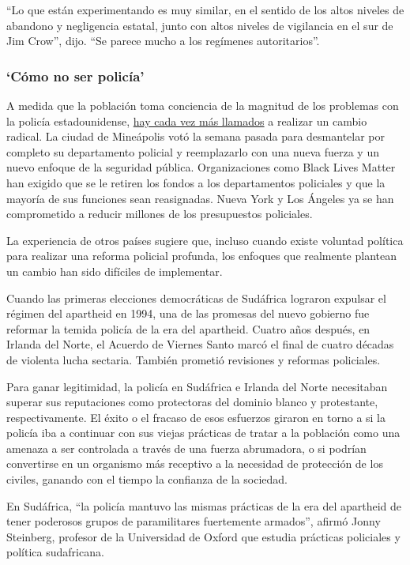 ``Lo que están experimentando es muy similar, en el sentido de los altos
niveles de abandono y negligencia estatal, junto con altos niveles de
vigilancia en el sur de Jim Crow'', dijo. ``Se parece mucho a los
regímenes autoritarios''.

\hypertarget{cuxf3mo-no-ser-policuxeda}{%
\subsubsection{`Cómo no ser policía'}\label{cuxf3mo-no-ser-policuxeda}}

A medida que la población toma conciencia de la magnitud de los
problemas con la policía estadounidense,
\href{https://www.nytimes3xbfgragh.onion/2020/06/08/us/unrest-defund-police.html}{hay
cada vez más llamados} a realizar un cambio radical. La ciudad de
Mineápolis votó la semana pasada para desmantelar por completo su
departamento policial y reemplazarlo con una nueva fuerza y un nuevo
enfoque de la seguridad pública. Organizaciones como Black Lives Matter
han exigido que se le retiren los fondos a los departamentos policiales
y que la mayoría de sus funciones sean reasignadas. Nueva York y Los
Ángeles ya se han comprometido a reducir millones de los presupuestos
policiales.

La experiencia de otros países sugiere que, incluso cuando existe
voluntad política para realizar una reforma policial profunda, los
enfoques que realmente plantean un cambio han sido difíciles de
implementar.

Cuando las primeras elecciones democráticas de Sudáfrica lograron
expulsar el régimen del apartheid en 1994, una de las promesas del nuevo
gobierno fue reformar la temida policía de la era del apartheid. Cuatro
años después, en Irlanda del Norte, el Acuerdo de Viernes Santo marcó el
final de cuatro décadas de violenta lucha sectaria. También prometió
revisiones y reformas policiales.

Para ganar legitimidad, la policía en Sudáfrica e Irlanda del Norte
necesitaban superar sus reputaciones como protectoras del dominio blanco
y protestante, respectivamente. El éxito o el fracaso de esos esfuerzos
giraron en torno a si la policía iba a continuar con sus viejas
prácticas de tratar a la población como una amenaza a ser controlada a
través de una fuerza abrumadora, o si podrían convertirse en un
organismo más receptivo a la necesidad de protección de los civiles,
ganando con el tiempo la confianza de la sociedad.

En Sudáfrica, ``la policía mantuvo las mismas prácticas de la era del
apartheid de tener poderosos grupos de paramilitares fuertemente
armados'', afirmó Jonny Steinberg, profesor de la Universidad de Oxford
que estudia prácticas policiales y política sudafricana.

